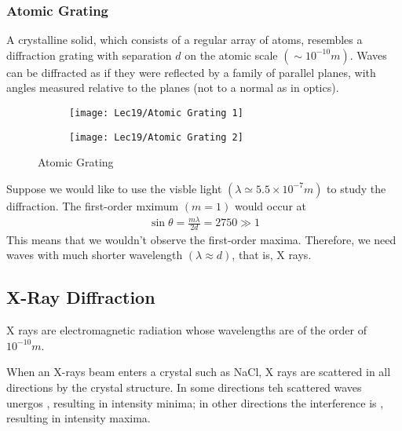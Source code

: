 \subsubsection{Atomic Grating}
A crystalline solid, which consists of a regular array of atoms, resembles a diffraction grating with separation $d$ on the atomic scale $(\sim 10^{-10} m)$. Waves can be diffracted as if they were reflected by a family of parallel planes, with angles measured relative to the planes (not to a normal as in optics). 

\begin{figure}[H]
    \centering
    \begin{subfigure}{0.15\textwidth}
        \centering
        \texttt{[image: Lec19/Atomic Grating 1]}

    \end{subfigure}
    \begin{subfigure}{0.15\textwidth}
        \centering
        \texttt{[image: Lec19/Atomic Grating 2]}

    \end{subfigure}
    \caption{Atomic Grating}
\end{figure}



Suppose we would like to use the visble light $(\lambda \simeq 5.5 \times 10^{-7} m)$ to study the diffraction. The first-order mximum $(m=1)$ would occur at 
\begin{align*}
    \sin\theta=\frac{m\lambda}{2d}=2750 \gg 1
\end{align*}
This means that we wouldn't observe the first-order maxima. Therefore, we need waves with much shorter wavelength $(\lambda \approx d)$, that is, X rays. 

\subsection{X-Ray Diffraction}
X rays are electromagnetic radiation whose wavelengths are of the order of $10^{-10}m$. 

When an X-rays beam enters a crystal such as NaCl, X rays are scattered in all directions by the crystal structure. In some directions teh scattered waves unergos , resulting in intensity minima; in other directions the interference is , resulting in intensity maxima. 

